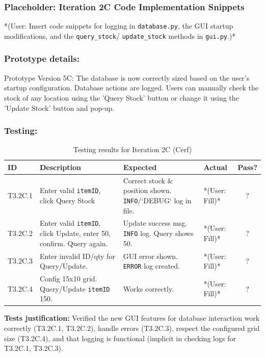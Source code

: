 \newpage
\subsubsection*{Placeholder: Iteration 2C Code Implementation Snippets}
*(User: Insert code snippets for logging in \verb|database.py|, the GUI startup modifications, and the \verb|query_stock|/ \verb|update_stock| methods in \verb|gui.py|.)*
\newpage

\subsubsection{Prototype details:}
Prototype Version 5C: The database is now correctly sized based on the user's startup configuration. Database actions are logged. Users can manually check the stock of any location using the 'Query Stock' button or change it using the 'Update Stock' button and pop-up.

\subsubsection{Testing:}
\begin{table}[htbp]
	\centering
	\begin{tabularx}{\textwidth}{|l|X|p{4.5cm}|p{1.5cm}|c|}
		\hline
		\textbf{ID} & \textbf{Description} & \textbf{Expected} & \textbf{Actual} & \textbf{Pass?} \\
		\hline
		T3.2C.1 & Enter valid \verb|itemID|, click Query Stock & Correct stock \& position shown. \verb|INFO|/`DEBUG` log in file. & *(User: Fill)* & ? \\
		\hline
		T3.2C.2 & Enter valid \verb|itemID|, click Update, enter 50, confirm. Query again. & Update success msg. \verb|INFO| log. Query shows 50. & *(User: Fill)* & ? \\
		\hline
		T3.2C.3 & Enter invalid ID/qty for Query/Update. & GUI error shown. \verb|ERROR| log created. & *(User: Fill)* & ? \\
		\hline
		T3.2C.4 & Config 15x10 grid. Query/Update \verb|itemID| 150. & Works correctly. & *(User: Fill)* & ? \\
		\hline
	\end{tabularx}
	\caption{Testing results for Iteration 2C (Cerf)}
\end{table}
\textbf{Tests justification:} Verified the new GUI features for database interaction work correctly (T3.2C.1, T3.2C.2), handle errors (T3.2C.3), respect the configured grid size (T3.2C.4), and that logging is functional (implicit in checking logs for T3.2C.1, T3.2C.3).

